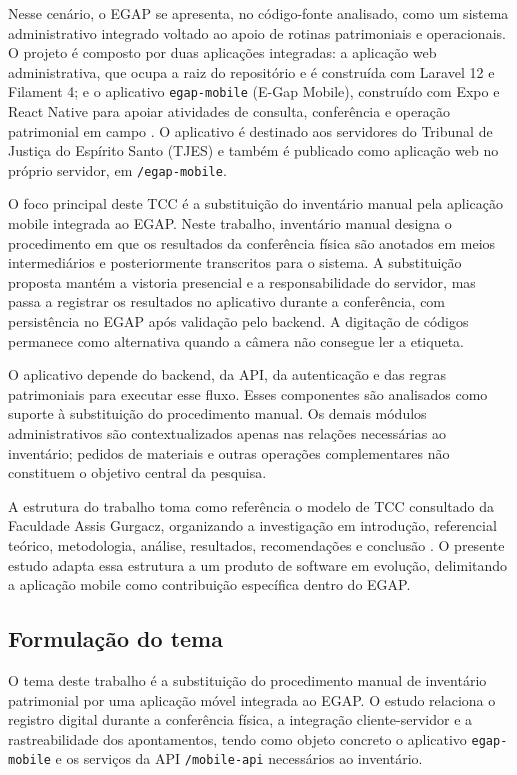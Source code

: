 \documentclass[12pt,a4paper]{article}
\begin{document}
Nesse cenário, o EGAP se apresenta, no código-fonte analisado, como um sistema administrativo integrado voltado ao apoio de rotinas patrimoniais e operacionais. O projeto é composto por duas aplicações integradas: a aplicação web administrativa, que ocupa a raiz do repositório e é construída com Laravel 12 e Filament 4; e o aplicativo \texttt{egap-mobile} (E-Gap Mobile), construído com Expo e React Native para apoiar atividades de consulta, conferência e operação patrimonial em campo \cite{egap-repo}. O aplicativo é destinado aos servidores do Tribunal de Justiça do Espírito Santo (TJES) e também é publicado como aplicação web no próprio servidor, em \texttt{/egap-mobile}.

O foco principal deste TCC é a substituição do inventário manual pela aplicação mobile integrada ao EGAP. Neste trabalho, inventário manual designa o procedimento em que os resultados da conferência física são anotados em meios intermediários e posteriormente transcritos para o sistema. A substituição proposta mantém a vistoria presencial e a responsabilidade do servidor, mas passa a registrar os resultados no aplicativo durante a conferência, com persistência no EGAP após validação pelo backend. A digitação de códigos permanece como alternativa quando a câmera não consegue ler a etiqueta.

O aplicativo depende do backend, da API, da autenticação e das regras patrimoniais para executar esse fluxo. Esses componentes são analisados como suporte à substituição do procedimento manual. Os demais módulos administrativos são contextualizados apenas nas relações necessárias ao inventário; pedidos de materiais e outras operações complementares não constituem o objetivo central da pesquisa.

A estrutura do trabalho toma como referência o modelo de TCC consultado da Faculdade Assis Gurgacz, organizando a investigação em introdução, referencial teórico, metodologia, análise, resultados, recomendações e conclusão \cite{modelo-fag}. O presente estudo adapta essa estrutura a um produto de software em evolução, delimitando a aplicação mobile como contribuição específica dentro do EGAP.

\subsection{Formulação do tema}

O tema deste trabalho é a substituição do procedimento manual de inventário patrimonial por uma aplicação móvel integrada ao EGAP. O estudo relaciona o registro digital durante a conferência física, a integração cliente-servidor e a rastreabilidade dos apontamentos, tendo como objeto concreto o aplicativo \texttt{egap-mobile} e os serviços da API \texttt{/mobile-api} necessários ao inventário.
\end{document}
